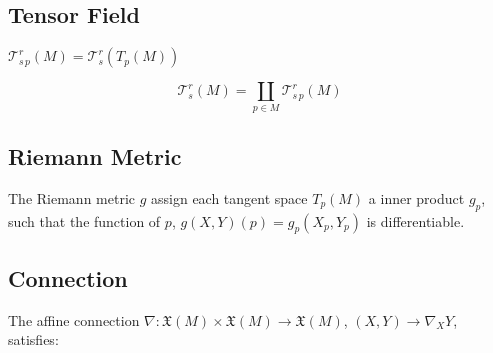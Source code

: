\documentclass{article}
\begin{document}
\subsection{Tensor Field}
$\mathcal T^r_{s \, p}(M) = \mathcal T^r_s(T_p(M))$

$$\mathcal T^r_s(M) = \coprod_{p \in M} \mathcal T^r_{s \, p}(M)$$

\subsection{Riemann Metric}
The Riemann metric $g$ assign each tangent space $T_p(M)$ a inner product $g_p$,
such that the function of $p$, $g(X, Y)(p) = g_p(X_p, Y_p)$ is differentiable.

\subsection{Connection}

The affine connection $\nabla : \mathfrak X(M) \times \mathfrak X(M) \to \mathfrak X(M)$,
$(X, Y) \to \nabla_X Y$, satisfies:
\end{document}
